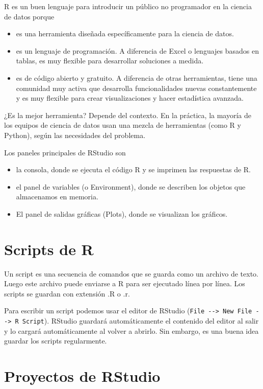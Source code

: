 \documentclass[
  letterpaper,
  DIV=11,
  numbers=noendperiod]{scrartcl}
\begin{document}
R es un buen lenguaje para introducir un público no programador en la
ciencia de datos porque

\begin{itemize}
\item
  es una herramienta diseñada específicamente para la ciencia de datos.
\item
  es un lenguaje de programación. A diferencia de Excel o lenguajes
  basados en tablas, es muy flexible para desarrollar soluciones a
  medida.
\item
  es de código abierto y gratuito. A diferencia de otras herramientas,
  tiene una comunidad muy activa que desarrolla funcionalidades nuevas
  constantemente y es muy flexible para crear visualizaciones y hacer
  estadística avanzada.
\end{itemize}

¿Es la mejor herramienta? Depende del contexto. En la práctica, la
mayoría de los equipos de ciencia de datos usan una mezcla de
herramientas (como R y Python), según las necesidades del problema.

Los paneles principales de RStudio son

\begin{itemize}
\item
  la consola, donde se ejecuta el código R y se imprimen las respuestas
  de R.
\item
  el panel de variables (o Environment), donde se describen los objetos
  que almacenamos en memoria.
\item
  El panel de salidas gráficas (Plots), donde se visualizan los
  gráficos.
\end{itemize}

\section{Scripts de R}\label{scripts-de-r}

Un script es una secuencia de comandos que se guarda como un archivo de
texto. Luego este archivo puede enviarse a R para ser ejecutado línea
por línea. Los scripts se guardan con extensión .R o .r.

Para escribir un script podemos usar el editor de RStudio
(\texttt{File\ -\/-\textgreater{}\ New\ File\ -\/-\textgreater{}\ R\ Script}).
RStudio guardará automáticamente el contenido del editor al salir y lo
cargará automáticamente al volver a abrirlo. Sin embargo, es una buena
idea guardar los scripts regularmente.

\section{Proyectos de RStudio}\label{proyectos-de-rstudio}
\end{document}
